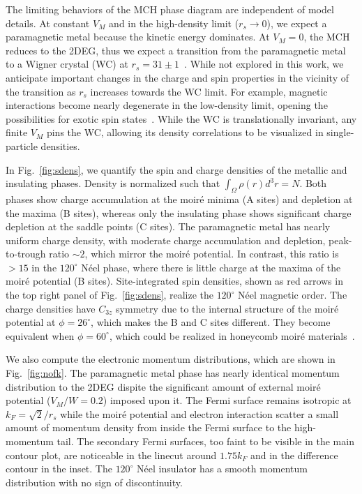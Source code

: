 \documentclass[aps,prb,showpacs,preprintnumbers,amsmath,amssymb,superscriptaddress,twocolumn]{revtex4-1}
\begin{document}
The limiting behaviors of the MCH phase diagram are independent of model details.
At constant $V_M$ and in the high-density limit ($r_s\rightarrow0$), we expect a paramagnetic metal because the kinetic energy dominates.
At $V_M=0$, the MCH reduces to the 2DEG, thus we expect a transition from the paramagnetic metal to a Wigner crystal (WC) at $r_s=31\pm1$~\cite{Drummond2009}.
While not explored in this work, we anticipate important changes in the charge and spin properties in the vicinity of the transition as $r_s$ increases towards the WC limit.
For example, magnetic interactions become nearly degenerate in the low-density limit, opening the possibilities for exotic spin states~\cite{Bernu2001}.
While the WC is translationally invariant, any finite $V_M$ pins the WC, allowing its density correlations to be visualized in single-particle densities.



In Fig.~\ref{fig:sdens}, we quantify the spin and charge densities of the metallic and insulating phases.
Density is normalized such that $\int_\Omega \rho(r)d^3r=N$.
Both phases show charge accumulation at the moir\'e minima (A sites) and depletion at the maxima (B sites), whereas only the insulating phase shows significant charge depletion at the saddle points (C sites).
The paramagnetic metal has nearly uniform charge density, with moderate charge accumulation and depletion, peak-to-trough ratio $\sim 2$, which mirror the moir\'e potential.
In contrast, this ratio is $> 15$ in the $120^\circ$ N\'eel phase, where there is little charge at the maxima of the moir\'e potential (B sites).
Site-integrated spin densities, shown as red arrows in the top right panel of Fig.~\ref{fig:sdens}, realize the $120^\circ$ N\'eel magnetic order.
The charge densities have $C_{3z}$ symmetry due to the internal structure of the moir\'e potential at $\phi=26^\circ$, which makes the B and C sites different.
They become equivalent when $\phi=60^\circ$, which could be realized in honeycomb moir\'e materials~\cite{Angeli2021}.

We also compute the
electronic momentum distributions, which are shown in Fig.~\ref{fig:nofk}.
The paramagnetic metal phase has nearly identical momentum distribution
to
the 2DEG dispite the significant amount of external moir\'e potential ($V_M/W=0.2$) imposed upon it.
The Fermi surface remains isotropic at $k_F=\sqrt{2}/r_s$ while the moir\'e potential and electron interaction scatter a small amount of momentum density from inside the Fermi surface to the high-momentum tail.
The secondary Fermi surfaces,
too faint to be visible in the main contour plot,
are noticeable in the linecut around $1.75k_F$ and in the difference contour in the inset.
The $120^\circ$ N\'eel insulator has a smooth momentum distribution with no sign of discontinuity.
\end{document}
